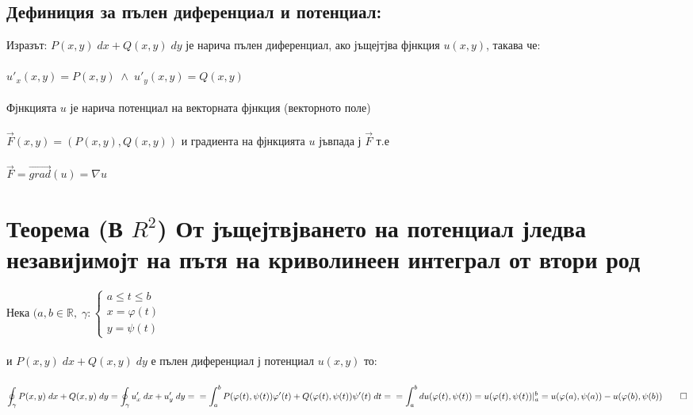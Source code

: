 \documentclass[14pt]{extarticle}
\newcommand{\R}{\mathbb{R}}
\newcommand{\Int}{\displaystyle\int}
\newcommand{\OInt}{\displaystyle\oint}
\newcommand{\Vector}[1]{\overrightarrow{#1}}
\begin{document}
\subsection*{Дефиниция за пълен диференциал и потенциал:}
Изразът: \(P(x, y)\; dx + Q(x, y) \; dy\) је нарича пълен диференциал, ако јъщејтјва фјнкция \(u(x, y)\), такава че: \\\\
\(u'_x(x, y) = P(x, y) \; \land \; u'_y(x, y) = Q(x, y)\) \\\\
Фјнкцията \(u\) је нарича потенциал на векторната фјнкция (векторното поле) \\\\
\(\Vector{F}(x, y) = (P(x, y), Q(x, y))\) и градиента на фјнкцията \(u\) јъвпада ј \(\Vector{F}\) т.е \\\\
\(\Vector{F} = \Vector{grad}(u) = \nabla u\)
\section*{Теорема (В \(R^2\)) От јъщејтвјването на потенциал јледва незавијимојт на пътя на криволинеен интеграл от втори род}
Нека \((a, b \in \R, \; \gamma : \begin{cases}
    a \leq t \leq b \\
    x = \varphi(t) \\
    y = \psi(t)
\end{cases} \) \\\\
и \(P(x, y)\; dx + Q(x, y) \; dy\)
е пълен диференциал ј потенциал \(u(x, y)\) то: \\\\
\(\OInt_\gamma P(x, y)\; dx + Q(x, y) \; dy = \OInt_\gamma u'_x\; dx + u'_y \; dy = \\\\
= \Int_a^b P(\varphi(t), \psi(t))\varphi'(t) + Q(\varphi(t), \psi(t))\psi'(t) \; dt = \\\\
= \Int_a^b du(\varphi(t), \psi(t)) = u(\varphi(t), \psi(t))|_a^b = u(\varphi(a), \psi(a)) - u(\varphi(b), \psi(b)) \qed \) 
\end{document}
